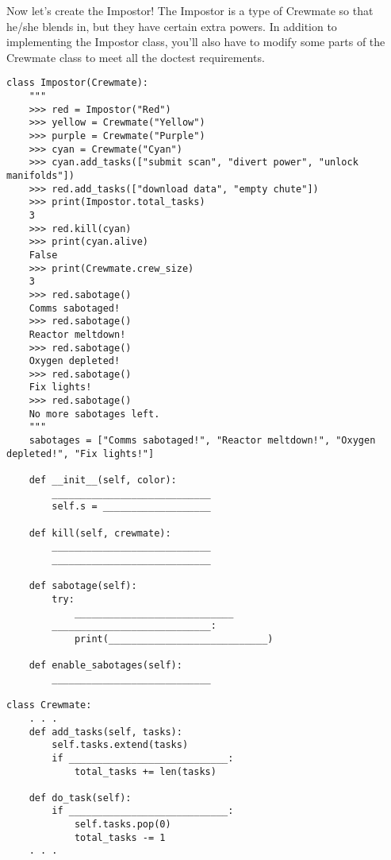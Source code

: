 \question Now let's create the Impostor! The Impostor is a type of Crewmate so that he/she blends in, but they have certain extra powers. In addition to implementing the Impostor class, you'll also have to modify some parts of the Crewmate class to meet all the doctest requirements.
\begin{lstlisting}
class Impostor(Crewmate):
    """
    >>> red = Impostor("Red")
    >>> yellow = Crewmate("Yellow")
    >>> purple = Crewmate("Purple")
    >>> cyan = Crewmate("Cyan")
    >>> cyan.add_tasks(["submit scan", "divert power", "unlock manifolds"])
    >>> red.add_tasks(["download data", "empty chute"])
    >>> print(Impostor.total_tasks)
    3
    >>> red.kill(cyan)
    >>> print(cyan.alive)
    False
    >>> print(Crewmate.crew_size)
    3
    >>> red.sabotage()
    Comms sabotaged!
    >>> red.sabotage()
    Reactor meltdown!
    >>> red.sabotage()
    Oxygen depleted!
    >>> red.sabotage()
    Fix lights!
    >>> red.sabotage()
    No more sabotages left.
    """
    sabotages = ["Comms sabotaged!", "Reactor meltdown!", "Oxygen depleted!", "Fix lights!"]
    
    def __init__(self, color):
        ____________________________
        self.s = ___________________
    
    def kill(self, crewmate):
        ____________________________
        ____________________________
    
    def sabotage(self):
        try:
            ____________________________
        ____________________________:
            print(____________________________)
    
    def enable_sabotages(self):
    	____________________________

class Crewmate:
    . . .
    def add_tasks(self, tasks):
        self.tasks.extend(tasks)
        if ____________________________:
            total_tasks += len(tasks)
    
    def do_task(self):
        if ____________________________:
            self.tasks.pop(0)
            total_tasks -= 1
    . . .
\end{lstlisting}
